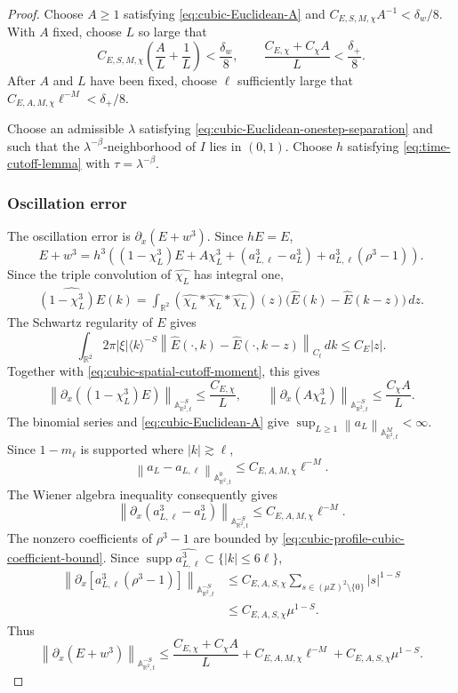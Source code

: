 \documentclass[12pt,reqno,letterpaper]{amsart}
\numberwithin{equation}{section}
\theoremstyle{definition}
\newcommand{\R}{\mathbb R}
\newcommand{\Z}{\mathbb Z}
\newcommand{\A}{\mathbb A}
\newcommand{\la}{\lambda}
\newcommand{\supp}{\operatorname{supp}}
\newcommand{\norm}[1]{\left\lVert #1\right\rVert}
\newcommand{\abs}[1]{\left\lvert #1\right\rvert}
\begin{document}
\begin{proof}
Choose $A\geq1$ satisfying \eqref{eq:cubic-Euclidean-A} and
$C_{E,S,M,\chi}A^{-1}<\delta_w/8$.  With $A$ fixed, choose $L$
so large that
\[
 C_{E,S,M,\chi}\left(\frac AL+\frac1L\right)<\frac{\delta_w}8,
 \qquad \frac{C_{E,\chi}+C_\chi A}{L}<\frac{\delta_+}{8}.
\]
After $A$ and $L$ have been fixed, choose $\ell$ sufficiently large
that $C_{E,A,M,\chi}\ell^{-M}<\delta_+/8$.

Choose an admissible $\la$ satisfying
\eqref{eq:cubic-Euclidean-onestep-separation} and such that the
$\la^{-\beta}$-neighborhood of $I$ lies in
$(0,1)$.  Choose $h$ satisfying \eqref{eq:time-cutoff-lemma} with
$\tau=\la^{-\beta}$.
\subsubsection*{Oscillation error}

The oscillation error is $\partial_x(E+w^3)$.  Since $hE=E$,
\begin{equation*}
 E+w^3=h^3\left(
 (1-\chi_L^3)E+A\chi_L^3
 +(a_{L,\ell}^3-a_L^3)
 +a_{L,\ell}^3(\rho^3-1)\right).
\end{equation*}
Since the triple convolution of $\widehat{\chi_L}$ has integral one,
\begin{align*}
 \widehat{(1-\chi_L^3)E}(k)
 =\int_{\R^2}
 (\widehat{\chi_L}*\widehat{\chi_L}*\widehat{\chi_L})(z)
 \bigl(\widehat E(k)-\widehat E(k-z)\bigr)\,dz.
\end{align*}
The Schwartz regularity of $E$ gives
\[
 \int_{\R^2}2\pi\abs\xi\langle k\rangle^{-S}
 \norm{\widehat E(\cdot,k)-\widehat E(\cdot,k-z)}_{C_t}\,dk
 \leq C_E\abs z.
\]
Together with \eqref{eq:cubic-spatial-cutoff-moment}, this gives
\[
 \norm{\partial_x((1-\chi_L^3)E)}_{\A^{-S}_{\R^2,t}}
 \leq\frac{C_{E,\chi}}L,
 \qquad
 \norm{\partial_x(A\chi_L^3)}_{\A^{-S}_{\R^2,t}}
 \leq\frac{C_\chi A}L.
\]
The binomial series and \eqref{eq:cubic-Euclidean-A} give
$\sup_{L\geq1}\norm{a_L}_{\A^M_{\R^2,t}}<\infty$.  Since $1-m_\ell$
is supported where $\abs k\gtrsim\ell$,
\[
 \norm{a_L-a_{L,\ell}}_{\A^0_{\R^2,t}}
 \leq C_{E,A,M,\chi}\ell^{-M}.
\]
The Wiener algebra inequality consequently gives
\[
 \norm{\partial_x(a_{L,\ell}^3-a_L^3)}
       _{\A^{-S}_{\R^2,t}}
 \leq C_{E,A,M,\chi}\ell^{-M}.
\]
The nonzero coefficients of $\rho^3-1$ are bounded by
\eqref{eq:cubic-profile-cubic-coefficient-bound}.  Since
$\supp\widehat{a_{L,\ell}^3}\subset\{\abs k\leq6\ell\}$,
\begin{align*}
 \norm{\partial_x\left[
 a_{L,\ell}^3(\rho^3-1)\right]}
 _{\A^{-S}_{\R^2,t}}
 &\leq C_{E,A,S,\chi}
 \sum_{s\in(\mu\Z)^2\setminus\{0\}}\abs s^{1-S}\\
 &\leq C_{E,A,S,\chi}\mu^{1-S}.
\end{align*}
Thus
\begin{equation*}
 \norm{\partial_x(E+w^3)}_{\A^{-S}_{\R^2,t}}
 \leq\frac{C_{E,\chi}+C_\chi A}{L}
 +C_{E,A,M,\chi}\ell^{-M}
 +C_{E,A,S,\chi}\mu^{1-S}.
\end{equation*}


\end{proof}
\end{document}
